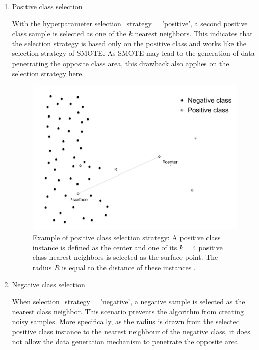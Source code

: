 \documentclass[parskip=full]{scrartcl}
\begin{document}
\begin{enumerate}[label=($\alph*$)]

\item Positive class selection

With the hyperparameter selection\_strategy = 'positive', a second positive 
class sample is selected as one of the $\mathit{k}$ nearest neighbors. This 
indicates that the selection strategy is based only on the positive class and 
works like the selection strategy of SMOTE. As SMOTE may lead to the generation 
of data penetrating the opposite class area, this drawback also applies on the 
selection strategy here.

\begin{figure}[H]
	\centering
	\includegraphics[width=0.51\linewidth]
		{./resources/positive_class_selection_strategy}
	\caption{Example of positive class selection strategy: A positive class 
	instance is defined as the center and one of its $\mathit{k = 4}$ positive 
	class nearest neighbors is selected as the surface point. The radius 
	$\mathit{R}$ is equal to the distance of these instances 
	\cite{Douzas.2019b}.}
	\label{fig:positiveclassselectionstrategy}
\end{figure}

\item Negative class selection

When selection\_strategy = 'negative', a negative sample is selected as the 
nearest class neighbor. This scenario prevents the algorithm from creating 
noisy samples. More specifically, as the radius is drawn from the selected 
positive class instance to the nearest neighbour of the negative class, it does 
not allow the data generation mechanism to penetrate the opposite area.


\end{enumerate}
\end{document}
